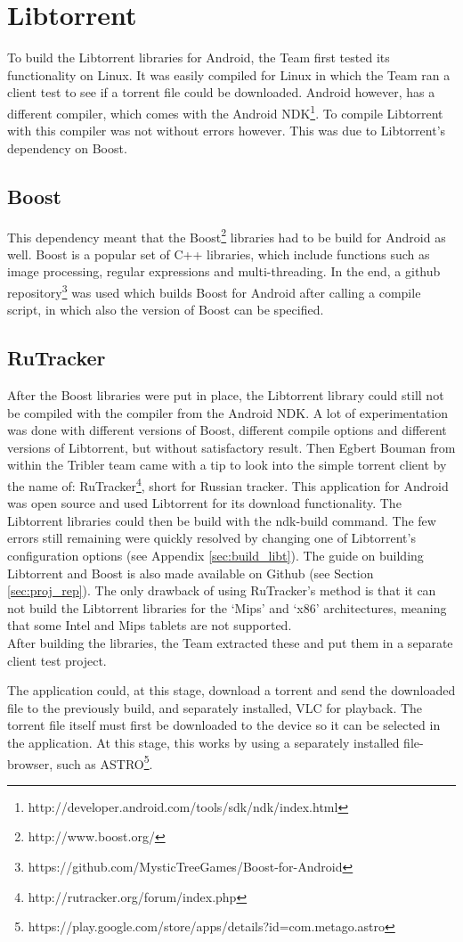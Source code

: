 \section{Libtorrent}
\thispagestyle{fancy}
\label{sec:libtorrent_impl}
To build the Libtorrent libraries for Android, the Team first tested its functionality on Linux. It was easily compiled for Linux in which the Team ran a client test to see if a torrent file could be downloaded. Android however, has a different compiler, which comes with the Android NDK\footnote{http://developer.android.com/tools/sdk/ndk/index.html}. To compile Libtorrent with this compiler was not without errors however. This was due to Libtorrent's dependency on Boost.

\subsection{Boost}
This dependency meant that the Boost\footnote{http://www.boost.org/} libraries had to be build for Android as well. Boost is a popular set of C++ libraries, which include functions such as image processing, regular expressions and multi-threading. In the end, a github repository\footnote{https://github.com/MysticTreeGames/Boost-for-Android} was used which builds Boost for Android after calling a compile script, in which also the version of Boost can be specified.

\subsection{RuTracker}
After the Boost libraries were put in place, the Libtorrent library could still not be compiled with the compiler from the Android NDK. A lot of experimentation was done with different versions of Boost, different compile options and different versions of Libtorrent, but without satisfactory result. Then Egbert Bouman from within the Tribler team came with a tip to look into the simple torrent client by the name of: RuTracker\footnote{http://rutracker.org/forum/index.php}, short for Russian tracker. This application for Android was open source and used Libtorrent for its download functionality. The Libtorrent libraries could then be build with the ndk-build command. The few errors still remaining were quickly resolved by changing one of Libtorrent's configuration options (see Appendix \ref{sec:build_libt}). The guide on building Libtorrent and Boost is also made available on Github (see Section \ref{sec:proj_rep}). The only drawback of using RuTracker's method is that it can not build the Libtorrent libraries for the `Mips' and `x86' architectures, meaning that some Intel and Mips tablets are not supported.\\ 
After building the libraries, the Team extracted these and put them in a separate client test project.

The application could, at this stage, download a torrent and send the downloaded file to the previously build, and separately installed, VLC for playback. The torrent file itself must first be downloaded to the device so it can be selected in the application. At this stage, this works by using a separately installed file-browser, such as ASTRO\footnote{https://play.google.com/store/apps/details?id=com.metago.astro}.